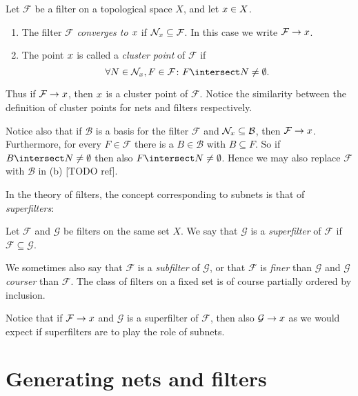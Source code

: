 \documentclass[article, a4paper, 11pt, oneside]{memoir}
\numberwithin{equation}{chapter}
\newcommand{\calB}{\mathcal{B}}
\newcommand{\calF}{\mathcal{F}}
\newcommand{\calG}{\mathcal{G}}
\theoremstyle{nonumberplain}
\begin{document}
\begin{definition}
    Let $\calF$ be a filter on a topological space $X$, and let $x \in X$.
    \begin{enumerate}
        \item The filter $\calF$ \emph{converges to $x$} if $\nhoods{\mylimit} \subseteq \calF$. In this case we write $\calF \to \mylimit$.
        
        \item The point $x$ is called a \emph{cluster point} of $\calF$ if
        \begin{equation*}
            \forall N \in \nhoods{\mylimit}, F \in \calF \colon F \intersect N \neq \emptyset.
        \end{equation*}
    \end{enumerate}
\end{definition}
%
Thus if $\calF \to \mylimit$, then $x$ is a cluster point of $\calF$. Notice the similarity between the definition of cluster points for nets and filters respectively.

\begin{remark}
    \label{rem:filter-cluster-points}
    Notice also that if $\calB$ is a basis for the filter $\calF$ and $\nhoods{\mylimit} \subseteq \calB$, then $\calF \to \mylimit$. Furthermore, for every $F \in \calF$ there is a $B \in \calB$ with $B \subseteq F$. So if $B \intersect N \neq \emptyset$ then also $F \intersect N \neq \emptyset$. Hence we may also replace $\calF$ with $\calB$ in (b) [TODO ref].
\end{remark}

In the theory of filters, the concept corresponding to subnets is that of \emph{superfilters}:

\begin{definition}[Superfilters]
    Let $\calF$ and $\calG$ be filters on the same set $X$. We say that $\calG$ is a \emph{superfilter} of $\calF$ if $\calF \subseteq \calG$.
\end{definition}
%
We sometimes also say that $\calF$ is a \emph{subfilter} of $\calG$, or that $\calF$ is \emph{finer} than $\calG$ and $\calG$ \emph{courser} than $\calF$. The class of filters on a fixed set is of course partially ordered by inclusion.

Notice that if $\calF \to \mylimit$ and $\calG$ is a superfilter of $\calF$, then also $\calG \to \mylimit$ as we would expect if superfilters are to play the role of subnets.


\section{Generating nets and filters}
\end{document}

